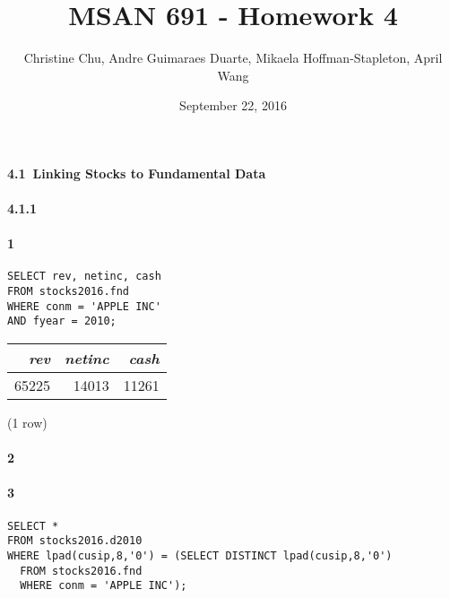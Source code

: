\documentclass[]{article}
\title{MSAN 691 - Homework 4}
\author{Christine Chu, Andre Guimaraes Duarte, Mikaela Hoffman-Stapleton, April Wang}
\date{September 22, 2016}
\let\oldparagraph\paragraph
\renewcommand{\paragraph}[1]{\oldparagraph{#1}\mbox{}}
\begin{document}
\maketitle

\paragraph{4.1\ Linking Stocks to Fundamental Data}

\paragraph{4.1.1}

\paragraph{1} 

\color{blue}
\begin{verbatim}
SELECT rev, netinc, cash
FROM stocks2016.fnd
WHERE conm = 'APPLE INC'
AND fyear = 2010;
\end{verbatim}
\color{black}

\begin{center}
\begin{tabular}{r | r | r}
\textit{rev} & \textit{netinc} & \textit{cash} \\
\hline
65225 & 14013 & 11261 \\
\end{tabular}

\noindent (1 row) \\
\end{center}

\paragraph{2} 



\paragraph{3} 

\color{blue}
\begin{verbatim}
SELECT *
FROM stocks2016.d2010
WHERE lpad(cusip,8,'0') = (SELECT DISTINCT lpad(cusip,8,'0')
  FROM stocks2016.fnd
  WHERE conm = 'APPLE INC');
\end{verbatim}
\color{black}
\end{document}
